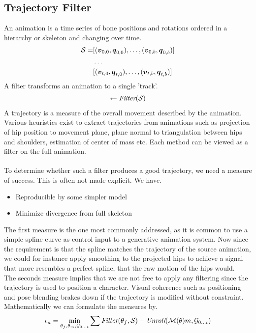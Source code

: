 \subsection{Trajectory Filter}
An animation is a time series of bone positions and rotations ordered in a hierarchy or skeleton and changing over time.  
\begin{subequations}
\begin{align}    
    \mathcal{S}=&[(\boldsymbol{v }_{0,0},\boldsymbol{q }_{0,0}), \dots, (\boldsymbol{v }_{0,b},\boldsymbol{q }_{0,b})]\\
        &\dots \\
            &[(\boldsymbol{v }_{t,0},\boldsymbol{q }_{t,0}), \dots, (\boldsymbol{v }_{t,b},\boldsymbol{q }_{t,b})]
\end{align}    
\end{subequations}
A filter transforms an animation to a single 'track'. 
\begin{equation}
    [\vec{v}_0,\quat{q}_0 \dots \vec{v}_t,\quat{q}_t] \leftarrow \ffunc(\skeleton)
\end{equation}
A trajectory is a measure of the overall movement described by the animation. Various heuristics exist to extract trajectories from animations such as projection of hip position to movement plane, plane normal to triangulation between hips and shoulders, estimation of center of mass etc. Each method can be viewed as a filter on the full animation.\\\\
To determine whether such a filter produces a good trajectory, we need a measure of success. This is often not made explicit. We have.
\begin{itemize}
    \item Reproducible by some simpler model
    \item Minimize divergence from full skeleton 
\end{itemize}
The first measure is the one most commonly addressed, as it is common to use a simple spline curve as control input to a generative animation system. Now since the requirement is that the spline matches the trajectory of the source animation, we could for instance apply smoothing to the projected hips to achieve a signal that more resembles a perfect spline, that the raw motion of the hips would.\\
The seconds measure implies that we are not free to apply any filtering since the trajectory is used to position a character. Visual coherence such as positioning and pose blending brakes down if the trajectory is modified without constraint.\\
Mathematically we can formulate the measures by.
\begin{equation}
    \epsilon_a=\min_{\theta_f,\theta_m,{\mathcal{G}_{0\dots{t}}}}\sum{ \textit{Filter} (\theta_f,\mathcal{S})- \textit{Unroll} ( \mathcal{M} (\theta)m, \mathcal{G} _{0\dots{t}}) }
\end{equation}



